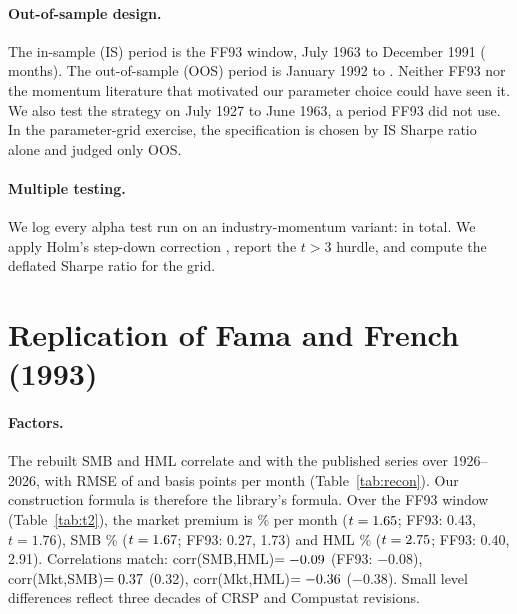 \documentclass[11pt]{article}
\newcommand{\tabdir}{../results/tables}
\begin{document}
\paragraph{Out-of-sample design.} The in-sample (IS) period is the FF93 window, July 1963 to December 1991 (\NIS{} months). The out-of-sample (OOS) period is January 1992 to \EndSample. Neither FF93 nor the momentum literature that motivated our parameter choice could have seen it. We also test the strategy on July 1927 to June 1963, a period FF93 did not use. In the parameter-grid exercise, the specification is chosen by IS Sharpe ratio alone and judged only OOS.

\paragraph{Multiple testing.} We log every alpha test run on an industry-momentum variant: \NTests{} in total. We apply Holm's step-down correction \citep{Holm1979}, report the \citet{HLZ2016} $t>3$ hurdle, and compute the deflated Sharpe ratio \citep{BLdP2014} for the grid.

\section{Replication of Fama and French (1993)}\label{sec:replication}

\paragraph{Factors.} The rebuilt SMB and HML correlate \SmbCorr{} and \HmlCorr{} with the published series over 1926--2026, with RMSE of \SmbRmse{} and \HmlRmse{} basis points per month (Table~\ref{tab:recon}). Our construction formula is therefore the library's formula. Over the FF93 window (Table~\ref{tab:t2}), the market premium is \MktMeanIS\% per month ($t=1.65$; FF93: 0.43, $t=1.76$), SMB \SmbMeanIS\% ($t=1.67$; FF93: 0.27, 1.73) and HML \HmlMeanIS\% ($t=2.75$; FF93: 0.40, 2.91). Correlations match: corr(SMB,HML)$=-0.09$ (FF93: $-0.08$), corr(Mkt,SMB)$=0.37$ (0.32), corr(Mkt,HML)$=-0.36$ ($-0.38$). Small level differences reflect three decades of CRSP and Compustat revisions.

\begin{table}[H]\centering\small
\caption{Rebuilt vs.\ published factors (percent per month).}\label{tab:recon}
\resizebox{0.85\linewidth}{!}{}
\end{table}
\end{document}
